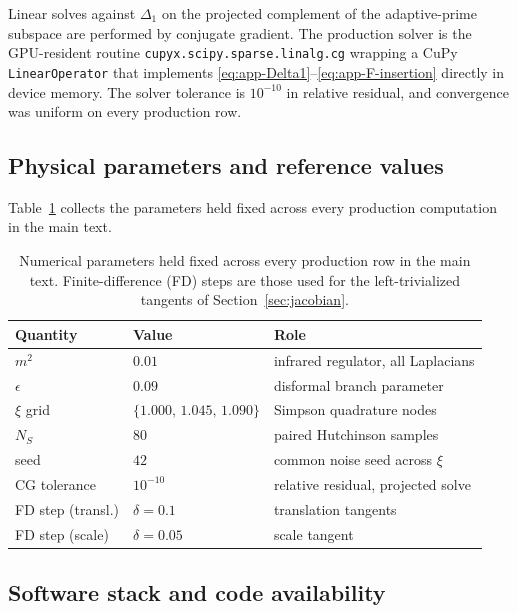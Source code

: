 \documentclass[a4paper,11pt]{article}
\theoremstyle{definition}
\begin{document}
Linear solves against $\Delta_1$ on the projected complement of the
adaptive-prime subspace are performed by conjugate gradient. The
production solver is the GPU-resident routine
\texttt{cupyx.scipy.sparse.linalg.cg} wrapping a CuPy
\texttt{LinearOperator} that implements
\eqref{eq:app-Delta1}--\eqref{eq:app-F-insertion} directly in device
memory. The solver tolerance is $10^{-10}$ in relative residual, and
convergence was uniform on every production row.

\subsection{Physical parameters and reference values}
\label{app:conv-parameters}

Table~\ref{tab:app-parameters} collects the parameters held fixed across
every production computation in the main text.

\begin{table}[h]
\centering
\begin{tabular}{lll}
\toprule
Quantity & Value & Role \\
\midrule
$m^2$             & $0.01$                          & infrared regulator, all Laplacians \\
$\epsilon$        & $0.09$                          & disformal branch parameter \\
$\xi$ grid        & $\{1.000,\,1.045,\,1.090\}$     & Simpson quadrature nodes \\
$N_S$             & $80$                            & paired Hutchinson samples \\
seed              & $42$                            & common noise seed across $\xi$ \\
CG tolerance      & $10^{-10}$                      & relative residual, projected solve \\
FD step (transl.) & $\delta = 0.1$                  & translation tangents \\
FD step (scale)   & $\delta = 0.05$                 & scale tangent \\
\bottomrule
\end{tabular}
\caption{Numerical parameters held fixed across every production row in
the main text. Finite-difference (FD) steps are those used for the
left-trivialized tangents of Section~\ref{sec:jacobian}.}
\label{tab:app-parameters}
\end{table}

\subsection{Software stack and code availability}
\label{app:conv-software}
\end{document}
